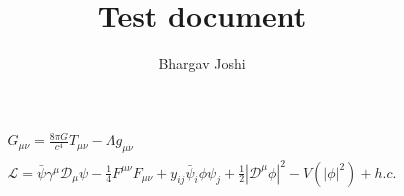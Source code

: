 \documentclass{article}
\author{Bhargav Joshi}
\title{Test document}
\begin{document}
\maketitle
\centering
\begin{gather}
G_{\mu\nu}=\frac{8\pi G}{c^4}T_{\mu\nu}-\Lambda g_{\mu\nu}\\
\mathcal{L}=\bar{\psi}\gamma^\mu\mathcal{D}_\mu\psi-\frac{1}{4}F^{\mu\nu}F_{\mu\nu}+y_{ij}\bar{\psi}_i\phi\psi_j+\frac{1}{2}|\mathcal{D}^\mu\phi|^2-V(|\phi|^2)+h.c.
\end{gather}
\end{document}
